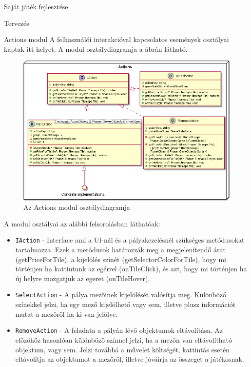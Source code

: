 \begin{MyChapter}{Saját játék fejlesztése}
\begin{MySection}{Tervezés}
		\begin{MySubSection}{Actions modul}
			A felhasználói interakcióval kapcsolatos események osztályai kaptak itt helyet.
			A modul osztálydiagramja a  ábrán látható.
			
			\begin{figure}[h!]
				\centering
				\includegraphics[width=1.12\textwidth]{kepek/uml/actions/action-pt1.png}
				\caption{Az Actions modul osztálydiagramja}
				\label{fig:uml:action}
			\end{figure}
			
			A modul osztályai az alábbi felsorolásban láthatóak:
			\begin{itemize}
				\item \texttt{IAction} - Interface ami a UI-nál és a pályakezelésnél szükséges metódusokat tartalmazza. Ezek a metódusok határozzák meg a megjelenítendő árat (getPriceForTile), a kijelölés színét (getSelectorColorForTile), hogy mi történjen ha kattintunk az egérrel (onTileClick), és azt, hogy mi történjen ha új helyre mozgatjuk az egeret (onTileHover).
				
				\item \texttt{SelectAction} - A pálya mezőinek kijelölését valósítja meg. Különböző színekkel jelzi, ha egy mező kijelölhető vagy sem, illetve plusz információt mutat a mezőről ha ki van jelölve.
				
				\item \texttt{RemoveAction} - A feladata a pályán lévő objektumok eltávolítása. Az előzőhöz hasonlóan különböző színnel jelzi, ha a mezőn van eltávolítható objektum, vagy sem. Jelzi továbbá a művelet költségét, kattintás esetén eltávolítja az objektumot a mezőről, illetve jóváírja az összeget a játékosnak.
				

\end{itemize}
\end{MySubSection}
\end{MySection}
\end{MyChapter}
